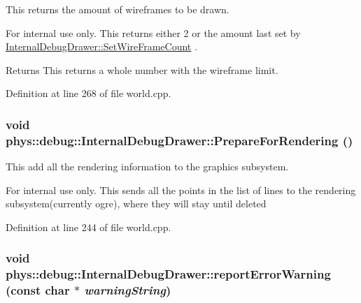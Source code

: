 This returns the amount of wireframes to be drawn. 

\begin{DoxyInternal}{For internal use only.}
This returns either 2 or the amount last set by \hyperlink{classphys_1_1debug_1_1InternalDebugDrawer_a76922fda7bb3b59d301e50d67e4f3c72}{InternalDebugDrawer::SetWireFrameCount} . \begin{DoxyReturn}{Returns}
This returns a whole number with the wireframe limit. 
\end{DoxyReturn}
\end{DoxyInternal}


Definition at line 268 of file world.cpp.

\hypertarget{classphys_1_1debug_1_1InternalDebugDrawer_a1002293d223ca20e5bccc3c3412ce262}{
\subsubsection[{PrepareForRendering}]{\setlength{\rightskip}{0pt plus 5cm}void phys::debug::InternalDebugDrawer::PrepareForRendering ()}}
\label{db/d27/classphys_1_1debug_1_1InternalDebugDrawer_a1002293d223ca20e5bccc3c3412ce262}


This add all the rendering information to the graphics subsystem. 

\begin{DoxyInternal}{For internal use only.}
This sends all the points in the list of lines to the rendering subsystem(currently ogre), where they will stay until deleted \end{DoxyInternal}


Definition at line 244 of file world.cpp.

\hypertarget{classphys_1_1debug_1_1InternalDebugDrawer_a4e3b4cbc861f76696b4d32f0cf068ea6}{
\subsubsection[{reportErrorWarning}]{\setlength{\rightskip}{0pt plus 5cm}void phys::debug::InternalDebugDrawer::reportErrorWarning (const char $\ast$ {\em warningString})}}
\label{db/d27/classphys_1_1debug_1_1InternalDebugDrawer_a4e3b4cbc861f76696b4d32f0cf068ea6}


